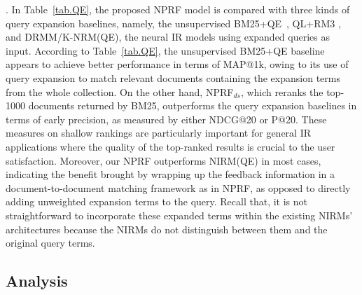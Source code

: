\documentclass[11pt,a4paper]{article}
\begin{document}
. In Table~\ref{tab.QE}, the proposed NPRF model is compared with three kinds of query expansion baselines, namely,
the unsupervised BM25+QE~\cite{DBLP:conf/trec/YeHHYL09}, QL+RM3 \cite{DBLP:conf/sigir/LavrenkoC01}, and DRMM/K-NRM(QE), the neural IR models using expanded queries as input. 
According to Table~\ref{tab.QE}, the unsupervised BM25+QE baseline appears to achieve
better performance in terms of MAP@1k, owing to its use of 
query expansion to match relevant documents containing the expansion terms from the whole collection. 
On the other hand, NPRF$_{ds}$, which reranks the top-1000 documents returned by BM25, outperforms the query expansion baselines in terms of early precision, as measured by either NDCG@20 or P@20. These measures on shallow rankings are particularly important for general IR applications 
where the quality of the top-ranked results is crucial to the user satisfaction. 
Moreover, our NPRF outperforms NIRM(QE) in most cases, indicating the benefit brought by wrapping up the feedback information in a document-to-document matching framework as in NPRF, as opposed to directly adding unweighted expansion terms to the query. 
Recall that, it is not straightforward to incorporate these expanded terms within the existing NIRMs' architectures because the NIRMs do not distinguish between them and the original query terms.

\vspace{\vignore}
\subsection{Analysis}\label{sec.analysis}
\vspace{\vignore}
\end{document}
